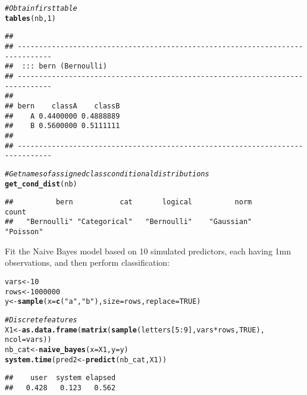 \documentclass{article}\usepackage[]{graphicx}\usepackage[]{color}
\makeatletter
\newcommand{\hlnum}[1]{\textcolor[rgb]{0.686,0.059,0.569}{#1}}%
\newcommand{\hlstr}[1]{\textcolor[rgb]{0.192,0.494,0.8}{#1}}%
\newcommand{\hlcom}[1]{\textcolor[rgb]{0.678,0.584,0.686}{\textit{#1}}}%
\newcommand{\hlopt}[1]{\textcolor[rgb]{0,0,0}{#1}}%
\newcommand{\hlstd}[1]{\textcolor[rgb]{0.345,0.345,0.345}{#1}}%
\newcommand{\hlkwb}[1]{\textcolor[rgb]{0.69,0.353,0.396}{#1}}%
\newcommand{\hlkwc}[1]{\textcolor[rgb]{0.333,0.667,0.333}{#1}}%
\newcommand{\hlkwd}[1]{\textcolor[rgb]{0.737,0.353,0.396}{\textbf{#1}}}%
\newenvironment{kframe}{%
 \def\at@end@of@kframe{}%
 \ifinner\ifhmode%
  \def\at@end@of@kframe{\end{minipage}}%
  \begin{minipage}{\columnwidth}%
 \fi\fi%
 \def\FrameCommand##1{\hskip\@totalleftmargin \hskip-\fboxsep
 \colorbox{shadecolor}{##1}\hskip-\fboxsep
     \hskip-\linewidth \hskip-\@totalleftmargin \hskip\columnwidth}%
 \MakeFramed {\advance\hsize-\width
   \@totalleftmargin\z@ \linewidth\hsize
   \@setminipage}}%
 {\par\unskip\endMakeFramed%
 \at@end@of@kframe}
\newenvironment{knitrout}{}{} %
\makeatother
\begin{document}
\begin{knitrout}
\begin{kframe}
\begin{alltt}
\hlcom{# Obtain first table}
\hlkwd{tables}\hlstd{(nb,} \hlnum{1}\hlstd{)}
\end{alltt}
\begin{verbatim}
## 
## ------------------------------------------------------------------------------ 
##  ::: bern (Bernoulli) 
## ------------------------------------------------------------------------------ 
##     
## bern    classA    classB
##    A 0.4400000 0.4888889
##    B 0.5600000 0.5111111
## 
## ------------------------------------------------------------------------------
\end{verbatim}
\begin{alltt}
\hlcom{# Get names of assigned class conditional distributions}
\hlkwd{get_cond_dist}\hlstd{(nb)}
\end{alltt}
\begin{verbatim}
##          bern           cat       logical          norm         count 
##   "Bernoulli" "Categorical"   "Bernoulli"    "Gaussian"     "Poisson"
\end{verbatim}
\end{kframe}
\end{knitrout}

Fit the Naive Bayes model based on 10 simulated predictors, each having 1mn observations, and then perform classification:

\begin{knitrout}
\color{fgcolor}\begin{kframe}
\begin{alltt}
\hlstd{vars} \hlkwb{<-} \hlnum{10}
\hlstd{rows} \hlkwb{<-} \hlnum{1000000}
\hlstd{y} \hlkwb{<-} \hlkwd{sample}\hlstd{(}\hlkwc{x} \hlstd{=} \hlkwd{c}\hlstd{(}\hlstr{"a"}\hlstd{,} \hlstr{"b"}\hlstd{),} \hlkwc{size} \hlstd{=  rows,} \hlkwc{replace} \hlstd{=} \hlnum{TRUE}\hlstd{)}

\hlcom{# Discrete features}
\hlstd{X1} \hlkwb{<-} \hlkwd{as.data.frame}\hlstd{(}\hlkwd{matrix}\hlstd{(}\hlkwd{sample}\hlstd{(letters[}\hlnum{5}\hlopt{:}\hlnum{9}\hlstd{], vars} \hlopt{*} \hlstd{rows,} \hlnum{TRUE}\hlstd{),}
                           \hlkwc{ncol} \hlstd{= vars))}
\hlstd{nb_cat} \hlkwb{<-} \hlkwd{naive_bayes}\hlstd{(}\hlkwc{x} \hlstd{= X1,} \hlkwc{y} \hlstd{= y)}
\hlkwd{system.time}\hlstd{(pred2} \hlkwb{<-} \hlkwd{predict}\hlstd{(nb_cat, X1))}
\end{alltt}
\begin{verbatim}
##    user  system elapsed 
##   0.428   0.123   0.562
\end{verbatim}
\end{kframe}
\end{knitrout}
\end{document}
